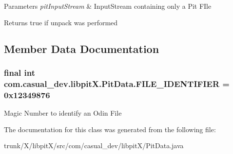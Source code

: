 \begin{DoxyParams}{Parameters}
{\em pit\-Input\-Stream} & Input\-Stream containing only a Pit F\-Ile \\
\hline
\end{DoxyParams}
\begin{DoxyReturn}{Returns}
true if unpack was performed 
\end{DoxyReturn}


\subsection{Member Data Documentation}
\hypertarget{classcom_1_1casual__dev_1_1libpitX_1_1PitData_aac62ade2b33051f8fcbf59e2b7117fb5}{
\subsubsection[{F\-I\-L\-E\-\_\-\-I\-D\-E\-N\-T\-I\-F\-I\-E\-R}]{\setlength{\rightskip}{0pt plus 5cm}final int com.\-casual\-\_\-dev.\-libpit\-X.\-Pit\-Data.\-F\-I\-L\-E\-\_\-\-I\-D\-E\-N\-T\-I\-F\-I\-E\-R = 0x12349876\hspace{0.3cm}{\ttfamily [static]}}}\label{classcom_1_1casual__dev_1_1libpitX_1_1PitData_aac62ade2b33051f8fcbf59e2b7117fb5}
Magic Number to identify an Odin File 

The documentation for this class was generated from the following file\-:\begin{DoxyCompactItemize}
\item 
trunk/\-X/libpit\-X/src/com/casual\-\_\-dev/libpit\-X/Pit\-Data.\-java\end{DoxyCompactItemize}
